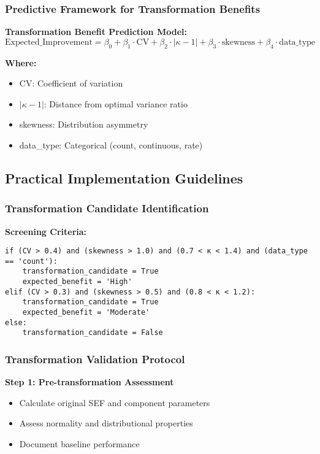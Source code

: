 \subsubsection{Predictive Framework for Transformation Benefits}

\textbf{Transformation Benefit Prediction Model:}
\begin{equation}
\text{Expected\_Improvement} = \beta_0 + \beta_1 \cdot \text{CV} + \beta_2 \cdot |\kappa - 1| + \beta_3 \cdot \text{skewness} + \beta_4 \cdot \text{data\_type}
\end{equation}

\textbf{Where:}
\begin{itemize}
    \item CV: Coefficient of variation
    \item $|\kappa - 1|$: Distance from optimal variance ratio
    \item skewness: Distribution asymmetry
    \item data\_type: Categorical (count, continuous, rate)
\end{itemize}

\subsection{Practical Implementation Guidelines}

\subsubsection{Transformation Candidate Identification}

\textbf{Screening Criteria:}
\begin{verbatim}
if (CV > 0.4) and (skewness > 1.0) and (0.7 < κ < 1.4) and (data_type == 'count'):
    transformation_candidate = True
    expected_benefit = 'High'
elif (CV > 0.3) and (skewness > 0.5) and (0.8 < κ < 1.2):
    transformation_candidate = True  
    expected_benefit = 'Moderate'
else:
    transformation_candidate = False
\end{verbatim}

\subsubsection{Transformation Validation Protocol}

\textbf{Step 1: Pre-transformation Assessment}
\begin{itemize}
    \item Calculate original SEF and component parameters
    \item Assess normality and distributional properties
    \item Document baseline performance
\end{itemize}


